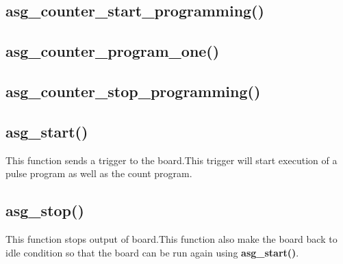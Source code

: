 \subsection{asg\_counter\_start\_programming()}
\subsection{asg\_counter\_program\_one()}
\subsection{asg\_counter\_stop\_programming()}

\subsection{asg\_start()}
This function sends a trigger to the board.This trigger will start execution of a pulse program as well as the count program.
\subsection{asg\_stop()}
This function stops output of board.This function also make the board back to idle condition so that the board can be run again using \textbf{asg\_start()}.
